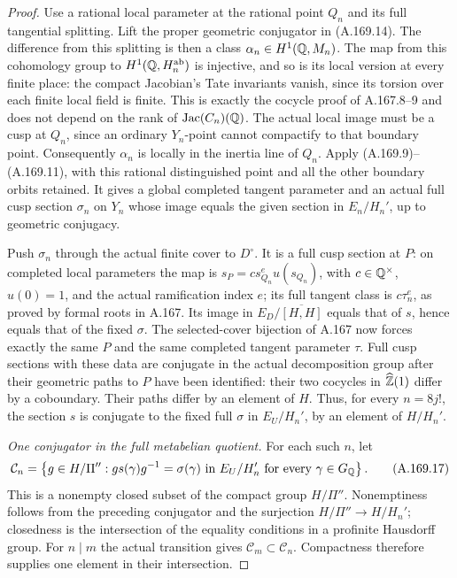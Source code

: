 \begin{proof}
Use a rational local parameter at the rational point \(Q_n\) and
its full tangential splitting.  Lift the proper geometric conjugator
in (A.169.14).  The difference from this splitting is then a class
\(\alpha_n\in H^1(\mathbb Q,M_n)\).  The map from this cohomology
group to \(H^1(\mathbb Q,H_n^{\rm ab})\) is injective, and so is its
local version at every finite place: the compact Jacobian's Tate
invariants vanish, since its torsion over each finite local field
is finite.  This is exactly the cocycle proof of A.167.8--9 and
does not depend on the rank of \(\operatorname{Jac}(C_n)(\mathbb Q)\).
The actual local image must be a cusp at \(Q_n\), since an
ordinary \(Y_n\)-point cannot compactify to that boundary point.
Consequently \(\alpha_n\) is locally in the inertia line of
\(Q_n\).  Apply (A.169.9)--(A.169.11), with this rational
distinguished point and all the other boundary orbits retained.
It gives a global completed tangent parameter and an actual full
cusp section \(\sigma_n\) on \(Y_n\) whose image equals the
given section in \(E_n/H_n'\), up to geometric conjugacy.

Push \(\sigma_n\) through the actual finite cover to
\(D^\circ\).  It is a full cusp section at \(P\): on completed
local parameters the map is \(s_P=c s_{Q_n}^{e}u(s_{Q_n})\),
with \(c\in\mathbb Q^\times\), \(u(0)=1\), and the actual
ramification index \(e\); its full tangent class is
\(c\tau_n^e\), as proved by formal roots in A.167.  Its image
in \(E_D/\overline{[H,H]}\) equals that of \(s\), hence
equals that of the fixed \(\sigma\).  The selected-cover
bijection of A.167 now forces exactly the same \(P\) and the
same completed tangent parameter \(\tau\).  Full cusp sections
with these data are conjugate in the actual decomposition group
after their geometric paths to \(P\) have been identified: their
two cocycles in \(\widehat{\mathbb Z}(1)\) differ by a coboundary.
Their paths differ by an element of \(H\).  Thus, for every
\(n=8j!\), the section \(s\) is conjugate to the fixed full
\(\sigma\) in \(E_U/H_n'\), by an element of \(H/H_n'\).

\emph{One conjugator in the full metabelian quotient.}
For each such \(n\), let
\[
 \mathcal C_n=\left\{g\in H/\Pi'':
      g s(\gamma)g^{-1}=\sigma(\gamma)
       \text{ in }E_U/H_n'\text{ for every }\gamma\in G_\mathbb Q\right\}.
\tag{A.169.17}
\]
This is a nonempty closed subset of the compact group \(H/\Pi''\).
Nonemptiness follows from the preceding conjugator and the surjection
\(H/\Pi''\to H/H_n'\); closedness is the intersection of the
equality conditions in a profinite Hausdorff group.  For \(n\mid m\)
the actual transition gives \(\mathcal C_m\subset\mathcal C_n\).
Compactness therefore supplies one element in their intersection.


\end{proof}
